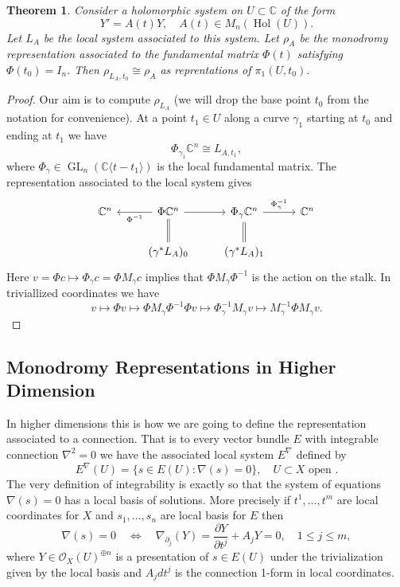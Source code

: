 \documentclass[12pt]{book}
\numberwithin{equation}{section}
\newtheorem{theorem}{Theorem}[subsection]
\theoremstyle{definition}
\theoremstyle{remark}
\newcommand{\CC}{\mathbb{C}}
\newcommand{\Ocal}{\mathcal{O}}
\newcommand{\hol}{\operatorname{Hol}}
\newcommand{\GL}{\operatorname{GL}}
\begin{document}
\begin{theorem}
	Consider a holomorphic system on $U\subset \CC$ of the form 
	$$ Y' = A(t) Y, \quad A(t) \in M_n(\hol(U)). $$
	Let $L_A$ be the local system associated to this system. 
	Let $\rho_A$ be the monodromy representation associated to the fundamental matrix $\Phi(t)$ satisfying $\Phi(t_0)=I_n$. 
	Then $\rho_{L_A,t_0} \cong \rho_A$ as reprentations of $\pi_1(U,t_0)$.
\end{theorem}
\begin{proof}
	Our aim is to compute $\rho_{L_A}$ (we will drop the base point $t_0$ from the notation for convenience). 
	At a point $t_1\in U$ along a curve $\gamma_1$ starting at $t_0$ and ending at $t_1$ we have 
	$$ \Phi_{\gamma_1} \CC^n \cong L_{A,t_1},$$
	where $\Phi_{\gamma} \in \GL_n(\CC\langle t-t_1\rangle)$ is the local fundamental matrix. 
	The representation associated to the local system gives 
	$$\begin{tikzcd}
	\CC^n & \arrow[l, "\Phi ^{-1}"] \Phi \CC^n \arrow[r] & \Phi_{\gamma} \CC^n \arrow[r, "\Phi_{\gamma}^{-1}"] & \CC^n  \\
	& (\gamma^*L_A)_0 \ar[u, equal] & (\gamma^*L_A)_1 \ar[u, equal]& 
	\end{tikzcd}
	$$
	Here $v= \Phi c \mapsto \Phi_{\gamma} c = \Phi M_{\gamma} c$ implies that $\Phi M_{\gamma} \Phi^{-1}$ is the action on the stalk. 
	In triviallized coordinates we have 
	$$ v \mapsto \Phi v \mapsto \Phi M_{\gamma} \Phi^{-1} \Phi v \mapsto \Phi_{\gamma}^{-1} M_{\gamma} v \mapsto M_{\gamma}^{-1} \Phi M_{\gamma} v.$$
\end{proof}

\subsection{Monodromy Representations in Higher Dimension}
In higher dimensions this is how we are going to define the representation associated to a connection. 
That is to every vector bundle $E$ with integrable connection $\nabla^2=0$ we have the associated local system $E^{\nabla}$ defined by 
 $$ E^{\nabla}(U) = \lbrace s \in E(U) \colon \nabla(s)=0 \rbrace, \quad U \subset X \mbox{ open }. $$
The very definition of integrability is exactly so that the system of equations $\nabla(s)=0$ has a local basis of solutions. 
More precisely if $t^1,\ldots,t^m$ are local coordinates for $X$ and $s_1,\ldots,s_n$ are local basis for $E$ then 
 $$ \nabla(s)=0 \quad \iff  \quad \nabla_{\partial_j}(Y) = \dfrac{\partial Y}{\partial t^j} + A_j Y =0, \quad 1\leq j \leq m,$$
where $Y\in \Ocal_X(U)^{\oplus n}$ is a presentation of $s \in E(U)$ under the trivialization given by the local basis and $A_jdt^j$ is the connection 1-form in local coordinates.
\end{document}
